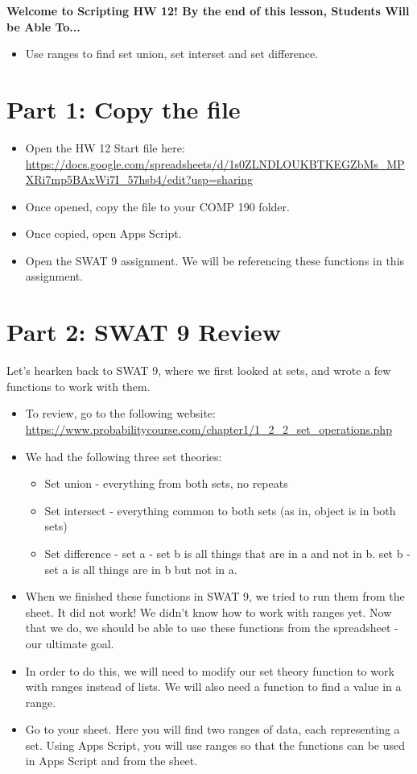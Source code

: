 \documentclass{article}
\newcommand{\AName}{Scripting HW 12}
\begin{document}
\textbf{Welcome to \AName!  By the end of this lesson, Students Will be Able To...}
\begin{itemize}
    \item Use ranges to find set union, set interset and set difference.
\end{itemize}


\section*{Part 1: Copy the file}
\begin{itemize}
    \item Open the HW 12 Start file here: \url{https://docs.google.com/spreadsheets/d/1s0ZLNDLOUKBTKEGZbMs_MPXRi7mp5BAxWi7I_57hsb4/edit?usp=sharing}
    \item Once opened, copy the file to your COMP 190 folder.
    \item Once copied, open Apps Script.
    \item Open the SWAT 9 assignment.  We will be referencing these functions in this assignment.
\end{itemize}

\section*{Part 2: SWAT 9 Review}
Let's hearken back to SWAT 9, where we first looked at sets, and wrote a few functions to work with them.
\begin{itemize}
    \item To review, go to the following website:  \url{https://www.probabilitycourse.com/chapter1/1_2_2_set_operations.php}
    \item We had the following three set theories:
    \begin{itemize}
    		\item Set union - everything from both sets, no repeats
    		\item Set intersect - everything common to both sets (as in, object is in both sets)
    		\item Set difference - set a - set b is all things that are in a and not in b.  set b - set a is all things are in b but not in a.
    	\end{itemize}
    	\item When we finished these functions in SWAT 9, we tried to run them from the sheet.  It did not work!  We didn't know how to work with ranges yet.  Now that we do, we should be able to use these functions from the spreadsheet - our ultimate goal.
    	\item In order to do this, we will need to modify our set theory function to work with ranges instead of lists.  We will also need a function to find a value in a range.
    	\item Go to your sheet.  Here you will find two ranges of data, each representing a set.  Using Apps Script, you will use ranges so that the functions can be used in Apps Script and from the sheet.
\end{itemize}
\end{document}
